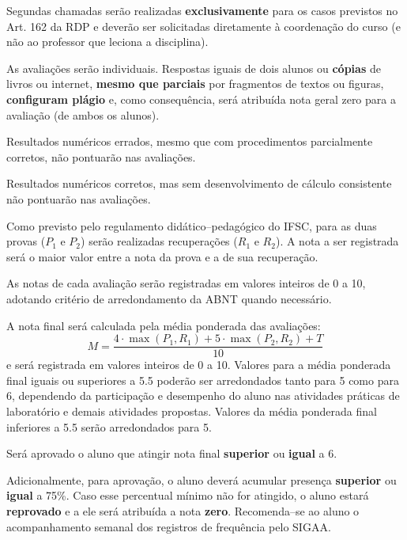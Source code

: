 \documentclass[10pt, a4paper]{article}
\begin{document}
    Segundas chamadas serão realizadas \textbf{exclusivamente} para os casos previstos no Art. 162 da RDP e deverão ser solicitadas diretamente à coordenação
    do curso (e não ao professor que leciona a disciplina).

    As avaliações serão individuais.
    Respostas iguais de dois alunos ou \textbf{cópias} de livros ou internet, \textbf{mesmo que parciais} por fragmentos de textos ou figuras, \textbf{configuram plágio} e,
    como consequência, será atribuída nota geral zero para a avaliação (de ambos os alunos).

    Resultados numéricos errados, mesmo que com procedimentos parcialmente corretos, não pontuarão nas avaliações.

    Resultados numéricos corretos, mas sem desenvolvimento de cálculo consistente não pontuarão nas avaliações.

    Como previsto pelo regulamento didático--pedagógico do IFSC, para as duas provas ($P_1$ e $P_2$) serão realizadas recuperações ($R_1$ e $R_2$).
    A nota a ser registrada será o maior valor entre a nota da prova e a de sua recuperação.

    As notas de cada avaliação serão registradas em valores inteiros de 0 a 10, adotando critério de arredondamento da ABNT quando necessário.

    A nota final será calculada pela média ponderada das avaliações:
    \[ M = \dfrac{4 \cdot  \max(P_1, R_1) + 5 \cdot  \max(P_2, R_2) +  T}{10} \]
    e será registrada em valores inteiros de 0 a 10.
    Valores para a média ponderada final iguais ou superiores a 5.5 poderão ser arredondados tanto para 5 como para 6, dependendo da participação e
    desempenho do aluno nas atividades práticas de laboratório e demais atividades propostas.
    Valores da média ponderada final inferiores a 5.5 serão arredondados para 5.

    Será aprovado o aluno que atingir nota final \textbf{superior} ou \textbf{igual} a 6.

    Adicionalmente, para aprovação, o aluno deverá acumular presença \textbf{superior} ou \textbf{igual} a 75\%.
    Caso esse percentual mínimo não for atingido, o aluno estará \textbf{reprovado} e a ele será atribuída a nota \textbf{zero}.
    Recomenda--se ao aluno o acompanhamento semanal dos registros de frequência pelo SIGAA.
\end{document}
